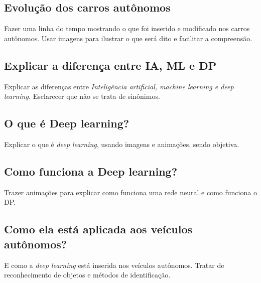 \documentclass[12pt,a4paper]{article}
\begin{document}
    \subsection{Evolução dos carros autônomos}
    \par Fazer uma linha do tempo mostrando o que foi inserido e modificado nos carros autônomos. Usar imagens para ilustrar o que será dito e facilitar a compreensão.

    \subsection{Explicar a diferença entre IA, ML e DP}
    \par Explicar as diferenças entre \emph{Inteligência artificial, machine learning e deep learning.} Esclarecer que não se trata de sinônimos.


    \subsection{O que é Deep learning?}
    \par Explicar o que é \emph{deep learning}, usando imagens e animações, sendo objetiva. 

    \subsection{Como funciona a Deep learning?}
    \par Trazer animações para explicar como funciona uma rede neural e como funciona o DP.


    \subsection{Como ela está aplicada aos veículos autônomos?}
    \par E como a \emph{deep learning} está inserida nos veículos autônomos. Tratar de reconhecimento de objetos e métodos de identificação.


\end{document}
